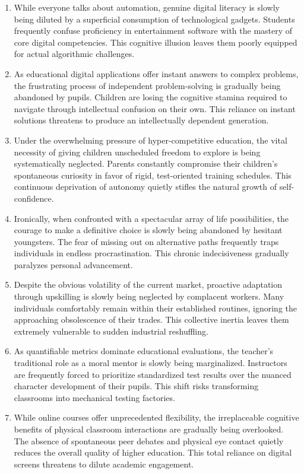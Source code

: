 ﻿\documentclass[lang=cn,11pt]{elegantbook}
\begin{document}
\begin{enumerate}
\item While everyone talks about automation, genuine digital literacy is slowly being diluted by a superficial consumption of technological gadgets. Students frequently confuse proficiency in entertainment software with the mastery of core digital competencies. This cognitive illusion leaves them poorly equipped for actual algorithmic challenges.
\item As educational digital applications offer instant answers to complex problems, the frustrating process of independent problem-solving is gradually being abandoned by pupils. Children are losing the cognitive stamina required to navigate through intellectual confusion on their own. This reliance on instant solutions threatens to produce an intellectually dependent generation.
\item Under the overwhelming pressure of hyper-competitive education, the vital necessity of giving children unscheduled freedom to explore is being systematically neglected. Parents constantly compromise their children's spontaneous curiosity in favor of rigid, test-oriented training schedules. This continuous deprivation of autonomy quietly stifles the natural growth of self-confidence.
\item Ironically, when confronted with a spectacular array of life possibilities, the courage to make a definitive choice is slowly being abandoned by hesitant youngsters. The fear of missing out on alternative paths frequently traps individuals in endless procrastination. This chronic indecisiveness gradually paralyzes personal advancement.
\item Despite the obvious volatility of the current market, proactive adaptation through upskilling is slowly being neglected by complacent workers. Many individuals comfortably remain within their established routines, ignoring the approaching obsolescence of their trades. This collective inertia leaves them extremely vulnerable to sudden industrial reshuffling.
\item As quantifiable metrics dominate educational evaluations, the teacher's traditional role as a moral mentor is slowly being marginalized. Instructors are frequently forced to prioritize standardized test results over the nuanced character development of their pupils. This shift risks transforming classrooms into mechanical testing factories.
\item While online courses offer unprecedented flexibility, the irreplaceable cognitive benefits of physical classroom interactions are gradually being overlooked. The absence of spontaneous peer debates and physical eye contact quietly reduces the overall quality of higher education. This total reliance on digital screens threatens to dilute academic engagement. 
\end{enumerate}
\end{document}
